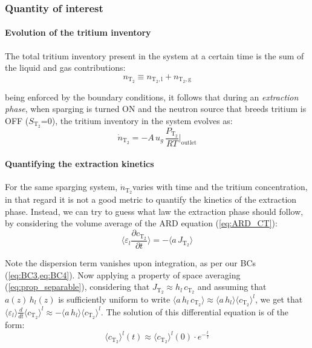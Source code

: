 \documentclass[a4paper,11pt,oneside]{report}
\newcommand{\PT}{\ensuremath{P_\mathrm{T_2}}}
\newcommand{\CT}{\ensuremath{c_\mathrm{T_2}}}
\newcommand{\JT}{\ensuremath{J_\mathrm{T_2}}}
\newcommand{\NT}{\ensuremath{n_\mathrm{T_2}}}
\newcommand{\dotNT}{\ensuremath{\dot n_\mathrm{T_2}}}
\newcommand{\NTl}{\ensuremath{n_\mathrm{T_2,l}}}
\newcommand{\NTg}{\ensuremath{n_\mathrm{T_2,g}}}
\newcommand{\ST}{\ensuremath{S_\mathrm{T_2}}}
\begin{document}
\subsubsection{Quantity of interest}

\paragraph{Evolution of the tritium inventory}
The total tritium inventory present in the system at a certain time is the sum of the liquid and gas contributions:
\begin{equation}
    \NT \equiv \NTl+\NTg
\end{equation}

 being enforced by the boundary conditions, it follows that during an \textit{extraction phase}, when sparging is turned ON and the neutron source that breeds tritium is OFF (\ST=0), the tritium inventory in the system evolves as:
\begin{equation}
    \label{eq:dotNT}
    \dotNT = -A\,u_g\,\frac{\PT}{RT} \bigg\rvert_\mathrm{outlet}
\end{equation}

\paragraph{Quantifying the extraction kinetics}
\label{sec:extraction_kinetics}
For the same sparging system, \dotNT varies with time and the tritium concentration, in that regard it is not a good metric to quantify the kinetics of the extraction phase. Instead, we can try to guess what law the extraction phase should follow, by considering the volume average of the ARD equation (\cref{eq:ARD_CT}):
\begin{equation}
    \langle \varepsilon_l \frac{\partial\CT}{\partial t} \rangle=-\langle a\,\JT \rangle 
\end{equation}

Note the dispersion term vanishes upon integration, as per our BCs (\cref{eq:BC3,eq:BC4}). Now applying a property of space averaging (\cref{eq:prop_separable}), considering that $\JT \approx h_l\,\CT$ and assuming that $a(z)\,h_l(z)$ is sufficiently uniform to write $\langle a\,h_l\,\CT\rangle\approx\langle a\,h_l\rangle \langle\CT\rangle^l$, we get that $\langle \varepsilon_l \rangle\frac{d}{dt}\langle\CT\rangle^l \approx -\langle a\,h_l\rangle \langle\CT\rangle^l$. The solution of this differential equation is of the form: 
\begin{equation}
    \langle\CT\rangle^l(t)\approx \langle\CT\rangle^l(0)\cdot e^{-\frac{t}{\tau}}
\end{equation}
\end{document}
